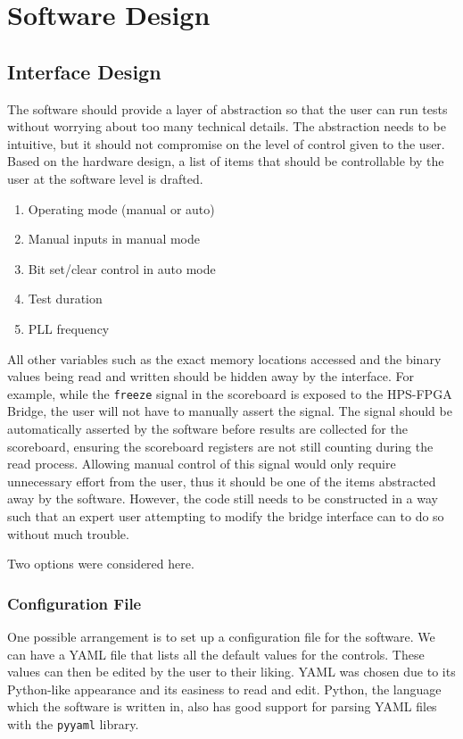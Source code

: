 \chapter{Software Design}

\section{Interface Design}
The software should provide a layer of abstraction so that the user can run tests without worrying about too many technical details.
The abstraction needs to be intuitive, but it should not compromise on the level of control given to the user.
Based on the hardware design, a list of items that should be controllable by the user at the software level is drafted.

\begin{enumerate}
  \setlength\itemsep{0pt}
  \item Operating mode (manual or auto)
  \item Manual inputs in manual mode
  \item Bit set/clear control in auto mode
  \item Test duration
  \item PLL frequency
\end{enumerate}

All other variables such as the exact memory locations accessed and the binary values being read and written should be hidden away by the interface.
For example, while the \texttt{freeze} signal in the scoreboard is exposed to the HPS-FPGA Bridge, the user will not have to manually assert the signal.
The signal should be automatically asserted by the software before results are collected for the scoreboard, ensuring the scoreboard registers are not still counting during the read process.
Allowing manual control of this signal would only require unnecessary effort from the user, thus it should be one of the items abstracted away by the software.
However, the code still needs to be constructed in a way such that an expert user attempting to modify the bridge interface can to do so without much trouble.

Two options were considered here.

\subsection{Configuration File}
One possible arrangement is to set up a configuration file for the software.
We can have a YAML file that lists all the default values for the controls.
These values can then be edited by the user to their liking.
YAML was chosen due to its Python-like appearance and its easiness to read and edit.
Python, the language which the software is written in, also has good support for parsing YAML files with the \texttt{pyyaml} library.

